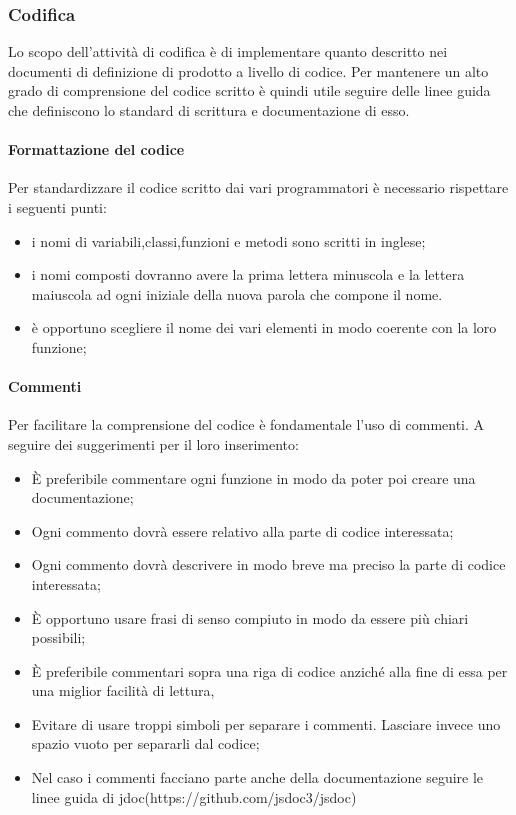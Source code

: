 \begin{itemize}
	\subsubsection{Codifica}%
	Lo scopo dell'attività di codifica è di implementare quanto descritto nei documenti di definizione di prodotto a livello di codice. Per mantenere un alto grado di comprensione del codice scritto è quindi utile seguire delle linee guida che definiscono lo standard di scrittura e documentazione di esso.
		\paragraph{Formattazione del codice}
		Per standardizzare il codice scritto dai vari programmatori è necessario rispettare i seguenti punti:
			\begin{itemize}
				\item i nomi di variabili,classi,funzioni e metodi sono scritti in inglese;
				\item i nomi composti dovranno avere la prima lettera minuscola e la lettera maiuscola ad ogni iniziale della nuova parola che compone il nome.
				\item è opportuno scegliere il nome dei vari elementi in modo coerente con la loro funzione;
				
			\end{itemize}
		\paragraph{Commenti}
		Per facilitare la comprensione del codice è fondamentale l'uso di commenti. A seguire dei suggerimenti per il loro inserimento:
		\begin{itemize}
			\item È preferibile commentare ogni funzione in modo da poter poi creare una documentazione;
			\item Ogni commento dovrà essere relativo alla parte di codice interessata;
			\item Ogni commento dovrà descrivere in modo breve ma preciso la parte di codice interessata;
			\item È opportuno usare frasi di senso compiuto in modo da essere più chiari possibili;
			\item È preferibile commentari sopra una riga di codice anziché alla fine di essa per una miglior facilità di lettura,
			\item Evitare di usare troppi simboli per separare i commenti. Lasciare invece uno spazio vuoto per separarli dal codice;
			\item Nel caso i commenti facciano parte anche della documentazione seguire le linee guida di jdoc(https://github.com/jsdoc3/jsdoc) %
		\end{itemize}

\end{itemize}
